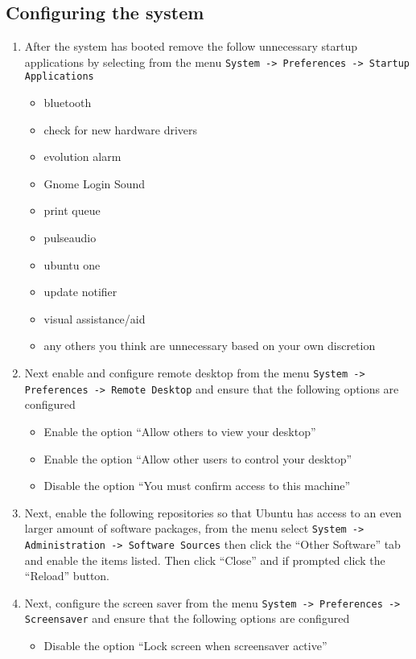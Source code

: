 \subsection{Configuring the system}
\label{sec:ubuntuconfig}
\begin{enumerate}
\item	After the system has booted remove the follow unnecessary startup applications by selecting from the menu  
		\verb|System -> Preferences -> Startup Applications|
\begin{itemize}
\item	bluetooth
\item	check for new hardware drivers
\item	evolution alarm
\item	Gnome Login Sound
\item	print queue
\item	pulseaudio
\item	ubuntu one
\item	update notifier
\item	visual assistance/aid
\item	any others you think are unnecessary based on your own discretion
\end{itemize}

\item Next enable and configure remote desktop from the menu \verb|System -> Preferences -> Remote Desktop| and ensure
that the following options are configured
\begin{itemize}
\item	Enable the option ``Allow others to view your desktop''
\item	Enable the option ``Allow other users to control your desktop''
\item	Disable the option ``You must confirm access to this machine''
\end{itemize}

\item 	Next, enable the following repositories so that Ubuntu has access to an even larger amount of software packages, from the
		menu select \verb|System -> Administration -> Software Sources| then click the ``Other Software'' tab and enable the items
		listed. Then click ``Close'' and if prompted click the ``Reload'' button. 

\item 	Next, configure the screen saver from the menu \verb|System -> Preferences -> Screensaver| and ensure that the following options
		are configured
\begin{itemize}
\item	Disable the option ``Lock screen when screensaver active''
\end{itemize}


\end{enumerate}
